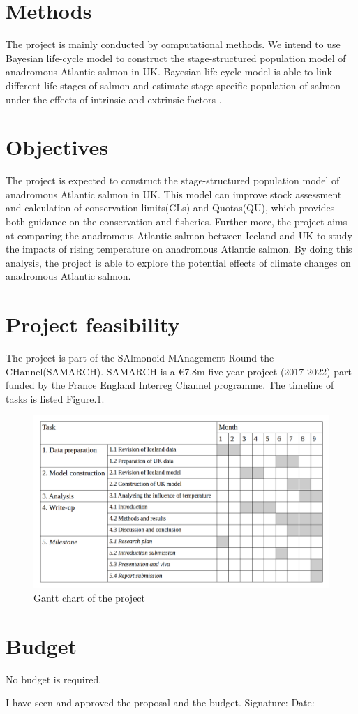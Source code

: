 \documentclass[11pt]{article}
\begin{document}
\begin{linenumbers}
\section{Methods}
The project is mainly conducted by computational methods. We intend to use Bayesian life-cycle model to construct the stage-structured population model of anadromous Atlantic salmon in UK. Bayesian life-cycle model is able to link different life stages of salmon and estimate stage-specific population of salmon under the effects of intrinsic and extrinsic factors \cite{ohlberger2018bayesian}. 

\section{Objectives}
The project is expected to construct the stage-structured population model of anadromous Atlantic salmon in UK. This model can improve stock assessment and calculation of conservation limits(CLs) and Quotas(QU), which provides both guidance on the conservation and fisheries. Further more, the project aims at comparing the anadromous Atlantic salmon between Iceland and UK to study the impacts of rising temperature on anadromous Atlantic salmon. By doing this analysis, the project is able to explore the potential effects of climate changes on anadromous Atlantic salmon.

\section{Project feasibility}
The project is part of the SAlmonoid MAnagement Round the CHannel(SAMARCH). SAMARCH is a €7.8m five-year project (2017-2022) part funded by the France England Interreg Channel programme. 
The timeline of tasks is listed Figure.1.
\begin{figure}[H]
   \includegraphics[width=\textwidth]{gantt_chart.png}
   \caption{Gantt chart of the project}
\end{figure}

\section{Budget}
No budget is required.




\end{linenumbers}


\newpage
\LARGE
I have seen and approved the proposal and the budget.
\bigbreak
\bigbreak
\bigbreak
\bigbreak
\large
Signature:
\bigbreak
\bigbreak
Date:
\end{document}
